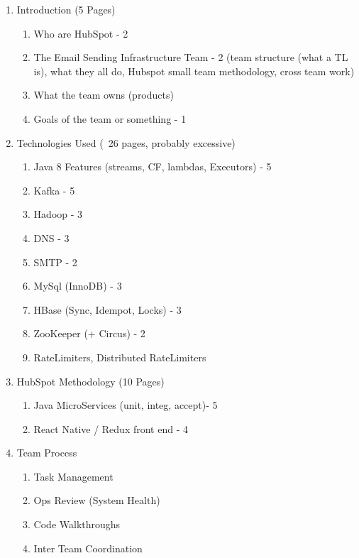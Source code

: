 

\begin{enumerate}
	\item Introduction (5 Pages)
	\begin{enumerate}
    	\item Who are HubSpot - 2
        \item The Email Sending Infrastructure Team - 2 (team structure (what a TL is), what they all do, Hubspot small team methodology, cross team work)
        \item What the team owns (products)
        \item Goals of the team or something - 1
    \end{enumerate}
    
    \item Technologies Used (~26 pages, probably excessive)
    \begin{enumerate}
    	\item Java 8 Features (streams, CF, lambdas, Executors) - 5
        \item Kafka - 5
        \item Hadoop - 3
        \item DNS - 3
        \item SMTP - 2
        \item MySql (InnoDB) - 3
        \item HBase (Sync, Idempot, Locks) - 3
        \item ZooKeeper (+ Circus) - 2
        \item RateLimiters, Distributed RateLimiters
    \end{enumerate}
    
    \item HubSpot Methodology (10 Pages)
    \begin{enumerate}
    	\item Java MicroServices (unit, integ, accept)- 5
        \item React Native / Redux front end - 4
    \end{enumerate}
    
	\item Team Process
	\begin{enumerate}
		\item Task Management
		\item Ops Review (System Health)
		\item Code Walkthroughs
		\item Inter Team Coordination
	\end{enumerate}	    
    

\end{enumerate}
